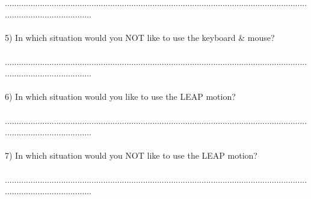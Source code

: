 \begin{appendix}
{\\
......................................................................................................................................................................\\
\\
5) In which situation would you NOT like to use the keyboard \& mouse?\\
\\
......................................................................................................................................................................\\
\\
6) In which situation would you like to use the LEAP motion?\\
\\
......................................................................................................................................................................\\
\\
7) In which situation would you NOT like to use the LEAP motion?\\
\\
......................................................................................................................................................................}

\newpage

\end{appendix}

